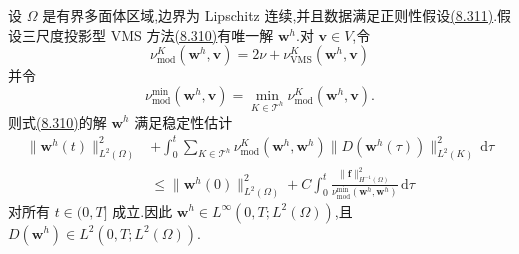 \begin{lemma}[速度 $\bm w^h$ 的稳定性]
\label{lem:vms-coarse-projection-stability}
设 $\Omega$ 是有界多面体区域,边界为 Lipschitz 连续,并且数据满足正则性假设\hyperref[eq:vms-coarse-projection-data-assumptions]{(8.311)}.假设三尺度投影型 VMS 方法\hyperref[eq:vms-coarse-projection-divergence-free-method]{(8.310)}有唯一解 $\bm w^h$.对 $\bm v\in V$,令
\begin{equation}\label{eq:vms-coarse-projection-modified-viscosity}
 \nu_{\mathrm{mod}}^K(\bm w^h,\bm v)
 =2\nu+\nu_{\mathrm{VMS}}^K(\bm w^h,\bm v)
\end{equation}
并令
\begin{equation}\label{eq:vms-coarse-projection-min-modified-viscosity}
 \nu_{\mathrm{mod}}^{\min}(\bm w^h,\bm v)
 =\min_{K\in\mathcal T^h}
   \nu_{\mathrm{mod}}^K(\bm w^h,\bm v).
\end{equation}
则式\hyperref[eq:vms-coarse-projection-divergence-free-method]{(8.310)}的解 $\bm w^h$ 满足稳定性估计
\begin{equation}\label{eq:vms-coarse-projection-stability-estimate}
\begin{aligned}
 \|\bm w^h(t)\|_{L^2(\Omega)}^2
 &+\int_0^t\sum_{K\in\mathcal T^h}
   \nu_{\mathrm{mod}}^K(\bm w^h,\bm w^h)
   \|D(\bm w^h(\tau))\|_{L^2(K)}^2\,\mathrm d\tau\\
 &\le
 \|\bm w^h(0)\|_{L^2(\Omega)}^2
 +C\int_0^t
   \frac{\|\bm f\|_{H^{-1}(\Omega)}^2}
        {\nu_{\mathrm{mod}}^{\min}(\bm w^h,\bm w^h)}
   \,\mathrm d\tau
\end{aligned}
\end{equation}
对所有 $t\in(0,T]$ 成立.因此
$\bm w^h\in L^\infty(0,T;L^2(\Omega))$,且
$D(\bm w^h)\in L^2(0,T;L^2(\Omega))$.
\end{lemma}

